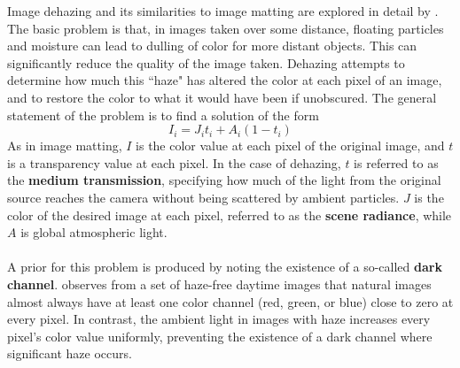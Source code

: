 Image dehazing and its similarities to image matting are explored in detail by \cite{he11}. The basic problem is that, in images taken over some distance, floating particles and moisture can lead to dulling of color for more distant objects. This can significantly reduce the quality of the image taken. Dehazing attempts to determine how much this ``haze" has altered the color at each pixel of an image, and to restore the color to what it would have been if unobscured. The general statement of the problem is to find a solution of the form
\[I_i = J_it_i+A_i(1-t_i)\]
As in image matting, $I$ is the color value at each pixel of the original image, and $t$ is a transparency value at each pixel. In the case of dehazing, $t$ is referred to as the \textbf{medium transmission}, specifying how much of the light from the original source reaches the camera without being scattered by ambient particles. $J$ is the color of the desired image at each pixel, referred to as the \textbf{scene radiance}, while $A$ is global atmospheric light.
\\\\
A prior for this problem is produced by noting the existence of a so-called \textbf{dark channel}. \cite{he11} observes from a set of haze-free daytime images that natural images almost always have at least one color channel (red, green, or blue) close to zero at every pixel. In contrast, the ambient light in images with haze increases every pixel's color value uniformly, preventing the existence of a dark channel where significant haze occurs.